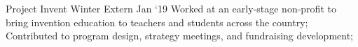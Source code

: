 \experience
    {Project Invent}
    {Winter Extern}
    {Jan `19}
    {
        Worked at an early-stage non-profit to bring invention education to teachers and students
        across the country;
        Contributed to program design, strategy meetings, and fundraising development;
    } 
